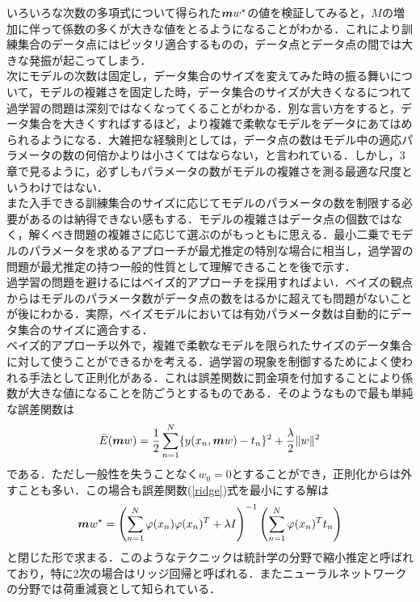 \documentclass[a4j,11pt]{article}
\newcommand{\bm}{\mbox{\boldmath {$m$}}}
\begin{document}
いろいろな次数の多項式について得られた$\bm w^{\star}$の値を検証してみると，$M$の増加に伴って係数の多くが大きな値をとるようになることがわかる．これにより訓練集合のデータ点にはピッタリ適合するものの，データ点とデータ点の間では大きな発振が起こってしまう．\\

次にモデルの次数は固定し，データ集合のサイズを変えてみた時の振る舞いについて，モデルの複雑さを固定した時，データ集合のサイズが大きくなるにつれて過学習の問題は深刻ではなくなってくることがわかる．別な言い方をすると，データ集合を大きくすればするほど，より複雑で柔軟なモデルをデータにあてはめられるようになる．大雑把な経験則としては，データ点の数はモデル中の適応パラメータの数の何倍かよりは小さくてはならない，と言われている．しかし，3章で見るように，必ずしもパラメータの数がモデルの複雑さを測る最適な尺度というわけではない．\\

また入手できる訓練集合のサイズに応じてモデルのパラメータの数を制限する必要があるのは納得できない感もする．モデルの複雑さはデータ点の個数ではなく，解くべき問題の複雑さに応じて選ぶのがもっともに思える．最小二乗でモデルのパラメータを求めるアプローチが最尤推定の特別な場合に相当し，過学習の問題が最尤推定の持つ一般的性質として理解できることを後で示す．\\

過学習の問題を避けるにはベイズ的アプローチを採用すればよい．ベイズの観点からはモデルのパラメータ数がデータ点の数をはるかに超えても問題がないことが後にわかる．実際，ベイズモデルにおいては有効パラメータ数は自動的にデータ集合のサイズに適合する．\\

ベイズ的アプローチ以外で，複雑で柔軟なモデルを限られたサイズのデータ集合に対して使うことができるかを考える．過学習の現象を制御するためによく使われる手法として正則化がある．これは誤差関数に罰金項を付加することにより係数が大きな値になることを防ごうとするものである．そのようなもので最も単純な誤差関数は
\begin{align}
  \label{ridge}
\tilde E(\bm w) = \frac{1}{2}\sum_{n=1}^N\{y(x_n,\bm w)- t_n\}^2+\frac{\lambda}{2}\|w\|^2
\end{align}
である．ただし一般性を失うことなく$w_0 = 0$とすることができ，正則化からは外すことも多い．この場合も誤差関数(\ref*{ridge})式を最小にする解は
\begin{align*}
  \bm w^{\star} = \left( \sum_{n=1}^N\varphi(x_n)\varphi(x_n)^T + \lambda I\right)^{-1}\left( \sum_{n=1}^N\varphi(x_n)^T t_n \right)
  \end{align*}
と閉じた形で求まる．このようなテクニックは統計学の分野で縮小推定と呼ばれており，特に2次の場合はリッジ回帰と呼ばれる．またニューラルネットワークの分野では荷重減衰として知られている．\\
\end{document}

